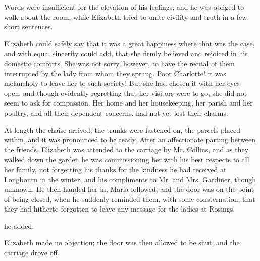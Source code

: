 Words were insufficient for the elevation of his feelings; and he was obliged to walk about the room, while Elizabeth tried to unite civility and truth in a few short sentences.


Elizabeth could safely say that it was a great happiness where that was the case, and with equal sincerity could add, that she firmly believed and rejoiced in his domestic comforts. She was not sorry, however, to have the recital of them interrupted by the lady from whom they sprang. Poor Charlotte! it was melancholy to leave her to such society! But she had chosen it with her eyes open; and though evidently regretting that her visitors were to go, she did not seem to ask for compassion. Her home and her housekeeping, her parish and her poultry, and all their dependent concerns, had not yet lost their charms.

At length the chaise arrived, the trunks were fastened on, the parcels placed within, and it was pronounced to be ready. After an affectionate parting between the friends, Elizabeth was attended to the carriage by Mr. Collins, and as they walked down the garden he was commissioning her with his best respects to all her family, not forgetting his thanks for the kindness he had received at Longbourn in the winter, and his compliments to Mr. and Mrs. Gardiner, though unknown. He then handed her in, Maria followed, and the door was on the point of being closed, when he suddenly reminded them, with some consternation, that they had hitherto forgotten to leave any message for the ladies at Rosings.

 he added, 

Elizabeth made no objection; the door was then allowed to be shut, and the carriage drove off.

